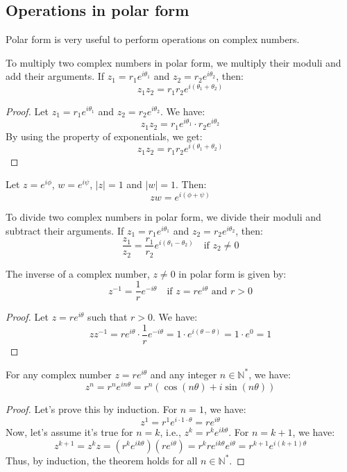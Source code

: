 \subsection{Operations in polar form}
Polar form is very useful to perform operations on complex numbers.
\begin{definition}
    To multiply two complex numbers in polar form, we multiply their moduli and add their arguments. If $z_1 = r_1 e^{i \theta_1}$ and $z_2 = r_2 e^{i \theta_2}$, then:
    \[
        z_1 z_2 = r_1 r_2 e^{i (\theta_1 + \theta_2)}
    \]
\end{definition}
\begin{proof}
    Let $z_1 = r_1 e^{i \theta_1}$ and $z_2 = r_2 e^{i \theta_2}$. We have:
    \[
        z_1 z_2 = r_1 e^{i \theta_1} \cdot r_2 e^{i \theta_2}
    \]
    By using the property of exponentials, we get:
    \[
        z_1 z_2 = r_1 r_2 e^{i (\theta_1 + \theta_2)}
    \]
\end{proof}

\begin{eg}
    Let $z = e^{i \phi}$, $w = e^{i \psi}$, $|z| = 1$ and $|w| = 1$. Then:
    \[
        z w = e^{i(\phi + \psi)}
    \]
\end{eg}

\begin{definition}
    To divide two complex numbers in polar form, we divide their moduli and subtract their arguments. If $z_1 = r_1 e^{i \theta_1}$ and $z_2 = r_2 e^{i \theta_2}$, then:
    \[
        \frac{z_1}{z_2} = \frac{r_1}{r_2} e^{i (\theta_1 - \theta_2)} \quad \text{if } z_2 \neq 0
    \]
\end{definition}

\begin{definition}
    The inverse of a complex number, $z \neq 0$ in polar form is given by:
    \[
        z^{-1} = \frac{1}{r} e^{-i \theta} \quad \text{if } z = r e^{i \theta} \text{ and } r > 0
    \]
\end{definition}
\begin{proof}
    Let $z = r e^{i \theta}$ such that $r > 0$. We have:
    \[
        z z^{-1} = r e^{i \theta} \cdot \frac{1}{r} e^{-i \theta} = 1 \cdot e^{i(\theta - \theta)} = 1 \cdot e^0 = 1
    \]
\end{proof}

\begin{definition}
    For any complex number $z = r e^{i \theta}$ and any integer $n \in \mathbb{N}^*$, we have:
    \[
        z^n = r^n e^{i n \theta} = r^n (\cos(n \theta) + i \sin(n \theta))
    \]
\end{definition}
\begin{proof}
    Let's prove this by induction. For $n = 1$, we have:
    \[
        z^1 = r^1 e^{i \cdot 1 \cdot \theta} = r e^{i \theta}
    \]
    Now, let's assume it's true for $n = k$, i.e., $z^k = r^k e^{i k \theta}$. For $n = k + 1$, we have:
    \[
        z^{k+1} = z^k z = (r^k e^{i k \theta})(r e^{i \theta}) = r^k r e^{i k \theta} e^{i \theta} = r^{k+1} e^{i (k+1) \theta}
    \]
    Thus, by induction, the theorem holds for all $n \in \mathbb{N}^*$.
\end{proof}

